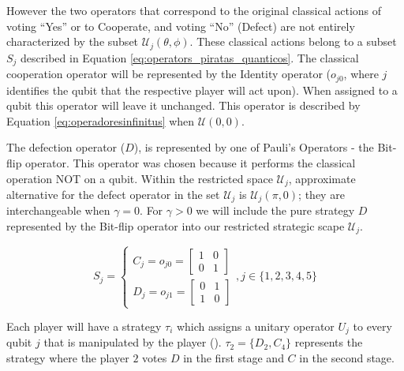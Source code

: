  However the two operators that correspond to the original classical actions of voting ``Yes'' or to Cooperate, and voting ``No'' (Defect) are not entirely characterized by the subset $\mathcal{U}_{j}(\theta, \phi)$. These classical actions belong to a subset $S_{j}$ described in Equation \ref{eq:operators_piratas_quanticos}.  
The classical cooperation operator will be represented by the Identity operator ($o_{j0}$, where $j$ identifies the qubit that the respective player will act upon). When assigned to a qubit this operator will leave it unchanged. This operator is described by Equation \ref{eq:operadoresinfinitus} when $\mathcal{U}(0,0)$.

The defection operator ($D$), is represented by one of Pauli's Operators - the Bit-flip operator. This operator was chosen because it performs the classical operation NOT on a qubit. 
Within the restricted space $\mathcal{U}_{j}$, approximate alternative for the defect operator in the set $\mathcal{U}_{j}$ is $\mathcal{U}_{j}(\pi, 0)$; they are interchangeable when $\gamma = 0$. For $\gamma >0$ we will include the pure strategy $D$ represented by the Bit-flip operator into our restricted strategic scape $\mathcal{U}_{j}$.




\begin{equation}
S_{j} = \begin{cases}
C_{j} = o_{j0}=\left[\begin{array}{cc}
1 & 0\\
0 & 1
\end{array}\right]\\
D_{j} = o_{j1}=\left[\begin{array}{cc}
0 & 1\\
1 & 0
\end{array}\right]
\end{cases} , j \in \{ 1, 2, 3, 4, 5 \}
\label{eq:operators_piratas_quanticos}
\end{equation}

Each player will have a strategy $\tau_{i}$  which assigns a
unitary operator $U_{j}$ to every qubit $j$ that is manipulated
by the player (). $\tau_{2}= \{D_{2},C_{4}\}$ represents the strategy where the player $2$ votes $D$ in the first stage and $C$ in the second stage.


